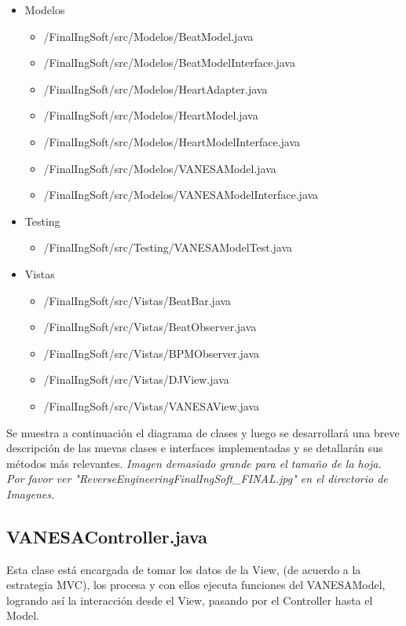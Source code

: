 \documentclass[10pt]{article} %
\begin{document}
\begin{itemize}
\begin{itemize}
\end{itemize}
\item Modelos
\begin{itemize}
\item /FinalIngSoft/src/Modelos/BeatModel.java
\item /FinalIngSoft/src/Modelos/BeatModelInterface.java
\item /FinalIngSoft/src/Modelos/HeartAdapter.java
\item /FinalIngSoft/src/Modelos/HeartModel.java
\item /FinalIngSoft/src/Modelos/HeartModelInterface.java
\item /FinalIngSoft/src/Modelos/VANESAModel.java
\item /FinalIngSoft/src/Modelos/VANESAModelInterface.java

\end{itemize}
\item Testing
\begin{itemize}
\item /FinalIngSoft/src/Testing/VANESAModelTest.java

\end{itemize}
\item Vistas
\begin{itemize}
\item /FinalIngSoft/src/Vistas/BeatBar.java
\item /FinalIngSoft/src/Vistas/BeatObserver.java
\item /FinalIngSoft/src/Vistas/BPMObserver.java
\item /FinalIngSoft/src/Vistas/DJView.java
\item /FinalIngSoft/src/Vistas/VANESAView.java

\end{itemize}


\end{itemize}
Se muestra a continuación el diagrama de clases y luego se desarrollará una breve descripción de las nuevas clases e interfaces implementadas y se detallarán sus métodos más relevantes.
\textit{Imagen demasiado grande para el tamaño de la hoja. Por favor ver "ReverseEngineeringFinalIngSoft\_FINAL.jpg" en el directorio de Imagenes.}

\subsection{VANESAController.java}
Esta clase está encargada de tomar los datos de la View, (de acuerdo a la estrategia MVC), los procesa y con ellos ejecuta funciones del VANESAModel, logrando así la interacción desde el View, pasando por el Controller hasta el Model.
\end{document}
